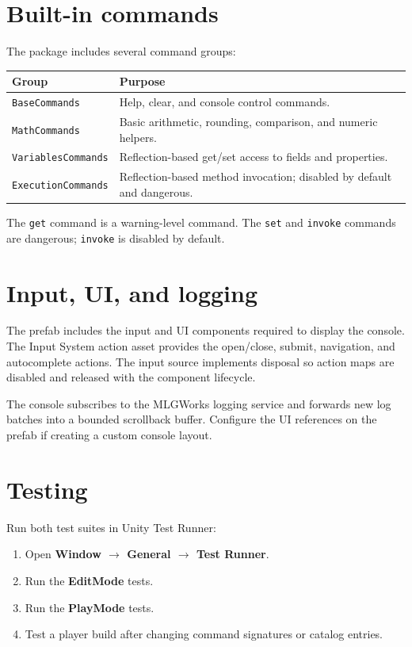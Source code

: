 \documentclass[11pt,a4paper]{article}
\begin{document}
\section{Built-in commands}

The package includes several command groups:

\begin{longtable}{p{}p{}}
\toprule
\textbf{Group} & \textbf{Purpose} \\
\midrule
\texttt{BaseCommands} & Help, clear, and console control commands. \\
\texttt{MathCommands} & Basic arithmetic, rounding, comparison, and numeric helpers. \\
\texttt{VariablesCommands} & Reflection-based get/set access to fields and properties. \\
\texttt{ExecutionCommands} & Reflection-based method invocation; disabled by default and dangerous. \\
\bottomrule
\end{longtable}

The \texttt{get} command is a warning-level command. The \texttt{set} and \texttt{invoke} commands are dangerous; \texttt{invoke} is disabled by default.

\section{Input, UI, and logging}

The prefab includes the input and UI components required to display the console. The Input System action asset provides the open/close, submit, navigation, and autocomplete actions. The input source implements disposal so action maps are disabled and released with the component lifecycle.

The console subscribes to the MLGWorks logging service and forwards new log batches into a bounded scrollback buffer. Configure the UI references on the prefab if creating a custom console layout.

\section{Testing}

Run both test suites in Unity Test Runner:

\begin{enumerate}[leftmargin=*]
  \item Open \textbf{Window $\rightarrow$ General $\rightarrow$ Test Runner}.
  \item Run the \textbf{EditMode} tests.
  \item Run the \textbf{PlayMode} tests.
  \item Test a player build after changing command signatures or catalog entries.
\end{enumerate}
\end{document}

